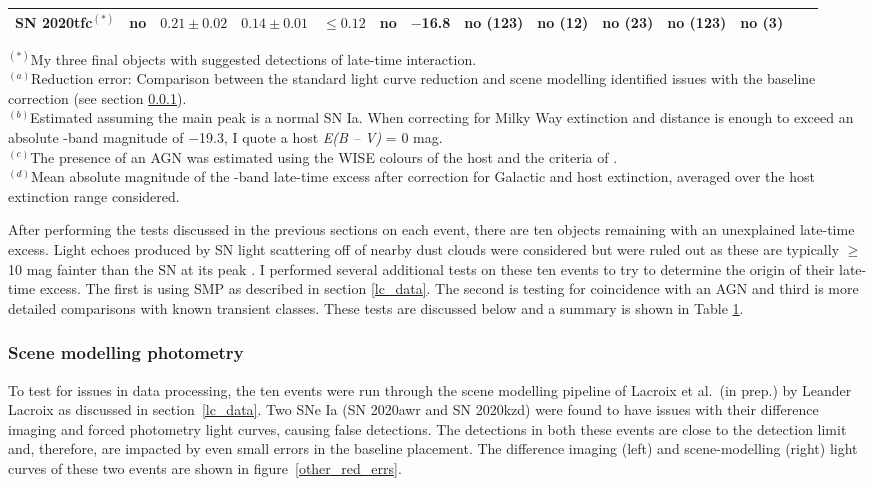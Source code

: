 \documentclass[a4paper,oneside,12pt, class=Latex/Classes/PhDthesisPSnPDF, crop=false]{standalone}
\begin{document}
\begin{table}
{\begin{tabular}{lccccccccccccc}
   SN 2020tfc$^{(*)}$ &no &$0.21\pm0.02$ &$0.14\pm0.01$ & $\leq 0.12$ & no &$-$16.8& no (123) & no (12) & no (23) & no (123) & no (3) &\\
   \hline
 \end{tabular}}
 \label{alt_trans_res}
\begin{flushleft}
$^{(*)}$My three final objects with suggested detections of late-time interaction.\\
$^{(a)}$Reduction error: Comparison between the standard light curve reduction and scene modelling identified issues with the baseline correction (see section \ref{sec:scene_modelling}).\\
$^{(b)}$Estimated assuming the main peak is a normal SN Ia. When correcting for Milky Way extinction and distance is enough to exceed an absolute \ztfg-band magnitude of $-$19.3, I quote a host \textit{E(B -- V)} = 0 mag. \\
$^{(c)}$The presence of an AGN was estimated using the WISE colours of the host and the criteria of \cite{WISE_crit}.\\
$^{(d)}$Mean absolute magnitude of the \ztfr-band late-time excess after correction for Galactic and host extinction, averaged over the host extinction range considered.\\
\end{flushleft}
\end{table} 

After performing the tests discussed in the previous sections on each event, there are ten objects remaining with an unexplained late-time excess. Light echoes produced by SN light scattering off of nearby dust clouds were considered but were ruled out as these are typically $\geq$10 mag fainter than the SN at its peak \citep{Patat_light_echoes, 2012cg}. I performed several additional tests on these ten events to try to determine the origin of their late-time excess. The first is using SMP as described in section \ref{lc_data}. The second is testing for coincidence with an AGN and third is more detailed comparisons with known transient classes. These tests are discussed below and a summary is shown in Table \ref{alt_trans_res}.

\subsubsection{Scene modelling photometry}
\label{sec:scene_modelling}
To test for issues in data processing, the ten events were run through the scene modelling pipeline of Lacroix et al.~(in prep.) by Leander Lacroix as discussed in section~\ref{lc_data}. Two SNe Ia (SN 2020awr and SN 2020kzd) were found to have issues with their difference imaging and forced photometry light curves, causing false detections. The detections in both these events are close to the detection limit and, therefore, are impacted by even small errors in the baseline placement. The difference imaging (left) and scene-modelling (right) light curves of these two events are shown in figure~\ref{other_red_errs}.
\end{document}
